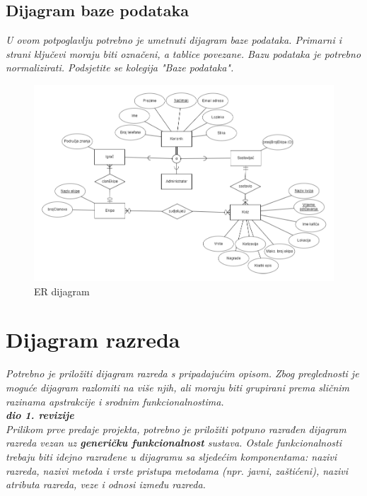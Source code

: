 			
				
				
			
			\subsection{Dijagram baze podataka}
				\textit{ U ovom potpoglavlju potrebno je umetnuti dijagram baze podataka. Primarni i strani ključevi moraju biti označeni, a tablice povezane. Bazu podataka je potrebno normalizirati. Podsjetite se kolegija "Baze podataka".}
			 \begin{figure}[!h]
			\centering
			\includegraphics[width=15cm]{slike/er.png} 
			\caption{ER dijagram}
			\label{fig:arhitektura}
	\end{figure}
			
			\eject
			
			
		\section{Dijagram razreda}
		
			\textit{Potrebno je priložiti dijagram razreda s pripadajućim opisom. Zbog preglednosti je moguće dijagram razlomiti na više njih, ali moraju biti grupirani prema sličnim razinama apstrakcije i srodnim funkcionalnostima.}\\
			
			\textbf{\textit{dio 1. revizije}}\\
			
			\textit{Prilikom prve predaje projekta, potrebno je priložiti potpuno razrađen dijagram razreda vezan uz \textbf{generičku funkcionalnost} sustava. Ostale funkcionalnosti trebaju biti idejno razrađene u dijagramu sa sljedećim komponentama: nazivi razreda, nazivi metoda i vrste pristupa metodama (npr. javni, zaštićeni), nazivi atributa razreda, veze i odnosi između razreda.}\\
			
